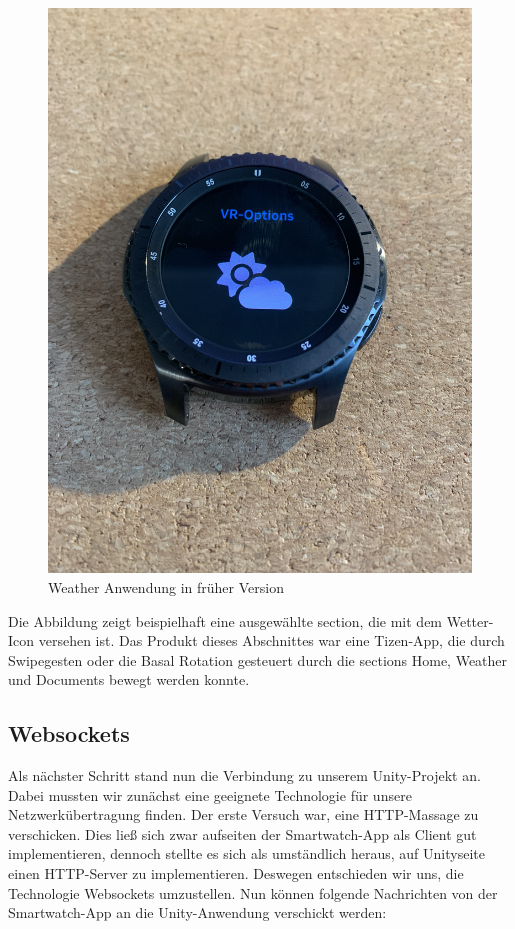 \documentclass[11pt, a4paper]{article}
\begin{document}
\begin{figure}[h]
	\centering
	\includegraphics[scale=.05]{assets/smartwatch_app_erstversion.jpg}
	\caption{Weather Anwendung in früher Version}
	\label{fig:app_erstversion}
\end{figure}

Die Abbildung zeigt beispielhaft eine ausgewählte section, die mit dem Wetter-Icon versehen ist. Das Produkt dieses Abschnittes war eine Tizen-App, die durch Swipegesten oder die Basal Rotation gesteuert durch die sections Home, Weather und Documents bewegt werden konnte. 

\subsection{Websockets}

Als nächster Schritt stand nun die Verbindung zu unserem Unity-Projekt an. Dabei mussten wir zunächst eine geeignete Technologie für unsere Netzwerkübertragung finden. Der erste Versuch war, eine HTTP-Massage zu verschicken. Dies ließ sich zwar aufseiten der Smartwatch-App als Client gut implementieren, dennoch stellte es sich als umständlich heraus, auf Unityseite einen HTTP-Server zu implementieren. Deswegen entschieden wir uns, die Technologie Websockets umzustellen. Nun können folgende Nachrichten von der Smartwatch-App an die Unity-Anwendung verschickt werden: 
\end{document}
